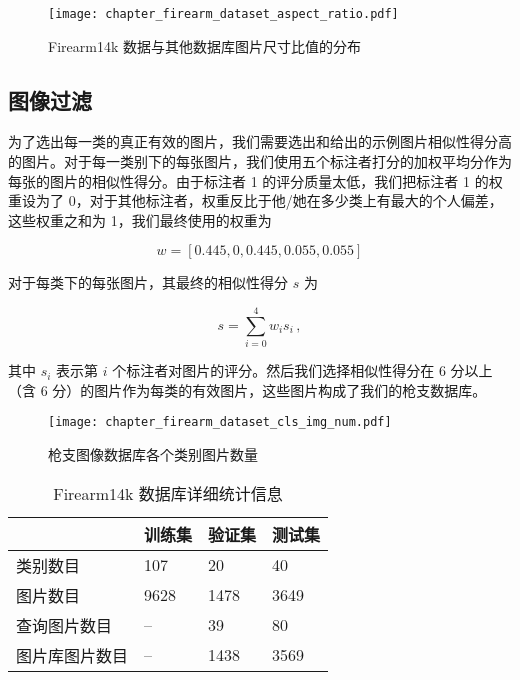 \begin{figure}[!t]
	\centering
	\texttt{[image: chapter\_firearm\_dataset\_aspect\_ratio.pdf]}
	\caption{Firearm14k 数据与其他数据库图片尺寸比值的分布}
	\label{fig:dataset_aspect_ratio}
\end{figure}

\subsection{图像过滤}
为了选出每一类的真正有效的图片，我们需要选出和给出的示例图片相似性得分高的图片。对于每一类别下的每张图片，我们使用五个标注者打分的加权平均分作为每张的图片的相似性得分。由于标注者 1 的评分质量太低，我们把标注者 1 的权重设为了 0，对于其他标注者，权重反比于他/她在多少类上有最大的个人偏差，这些权重之和为 1，我们最终使用的权重为

 \[w = [0.445, 0, 0.445, 0.055, 0.055]\]

对于每类下的每张图片，其最终的相似性得分 $s$ 为

\begin{equation}
s = \sum_{i=0}^{4}w_{i}s_{i}\, ,
\end{equation}

其中 $s_i$ 表示第 $i$ 个标注者对图片的评分。然后我们选择相似性得分在 6 分以上（含 6 分）的图片作为每类的有效图片，这些图片构成了我们的枪支数据库。

\begin{figure}[!t]
	\centering
	\texttt{[image: chapter\_firearm\_dataset\_cls\_img\_num.pdf]}
	\caption{枪支图像数据库各个类别图片数量}
	\label{fig:dataset_cls_img_num}
\end{figure}

\begin{table}[!t]
	\centering
	\caption[Firearm14k 数据库详细统计信息]{Firearm14k 数据库详细统计信息}
	\label{table:train_val_test_stat}
	\begin{tabular}{@{}llll@{}}
		\toprule
		          & 训练集 & 验证集 & 测试集 \\
		\midrule
		类别数目 & 107       & 20             & 40       \\
		图片数目 & 9628      & 1478           & 3649     \\
		查询图片数目 & --        & 39             & 80       \\
		图片库图片数目 & -- & 1438 &  3569 \\
		\bottomrule
	\end{tabular}
\end{table}

